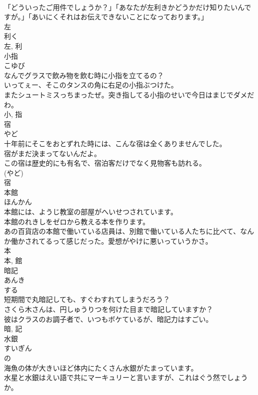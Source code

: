 \documentclass[8pt]{extreport}
\begin{document}
\begin{CJK}{UTF8}{min}
\\	「どういったご用件でしょうか？」「あなたが左利きかどうかだけ知りたいんですが。」「あいにくそれはお伝えできないことになっております。」	
\\	左 
\\	利く 
\\	左, 利	
\\	小指	
\\	こゆび	
\\	なんでグラスで飲み物を飲む時に小指を立てるの？	
\\	いってぇー、そこのタンスの角に右足の小指ぶつけた。	
\\	またシュートミスっちまったぜ。突き指してる小指のせいで今日はまじでダメだわ。	
\\	小, 指	
\\	宿	
\\	やど	
\\	十年前にそこをおとずれた時には、こんな宿は全くありませんでした。	
\\	宿がまだ決まってないんだよ。	
\\	この宿は歴史的にも有名で、宿泊客だけでなく見物客も訪れる。	
\\	(やど) 
\\	宿	
\\	本館	
\\	ほんかん	
\\	本館には、ようじ教室の部屋がへいせつされています。	
\\	本館のれきしをゼロから教える本を作ります。	
\\	あの百貨店の本館で働いている店員は、別館で働いている人たちに比べて、なんか働かされてるって感じだった。愛想がやけに悪いっていうかさ。	
\\	本 
\\	本, 館	
\\	暗記	
\\	あんき	
\\	する 
\\	短期間で丸暗記しても、すぐわすれてしまうだろう？	
\\	さくら木さんは、円しゅうりつを何けた目まで暗記していますか？	
\\	彼はクラスのお調子者で、いつもボケているが、暗記力はすごい。	
\\	暗, 記	
\\	水銀	
\\	すいぎん	
\\	の 
\\	海魚の体が大きいほど体内にたくさん水銀がたまっています。	
\\	水星と水銀はえい語で共にマーキュリーと言いますが、これはぐう然でしょうか。	

\end{CJK}
\end{document}
